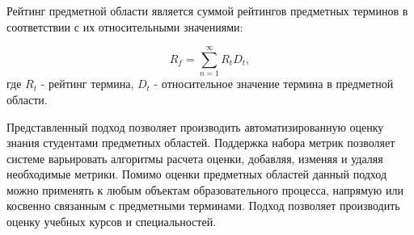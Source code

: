 Рейтинг предметной области является суммой рейтингов предметных терминов в соответствии с их относительными значениями:

$$
    R_f = \sum_{n=1}^{\infty} R_tD_t,
$$
где \(R_t\) - рейтинг термина, \(D_t\) - относительное значение термина в предметной области.

Представленный подход позволяет производить автоматизированную оценку знания студентами предметных областей. Поддержка набора метрик позволяет системе варьировать алгоритмы расчета оценки, добавляя, изменяя и удаляя необходимые метрики. Помимо оценки предметных областей данный подход можно применять к любым объектам образовательного процесса, напрямую или косвенно связанным с предметными терминами. Подход позволяет производить оценку учебных курсов и специальностей.

\clearpage
